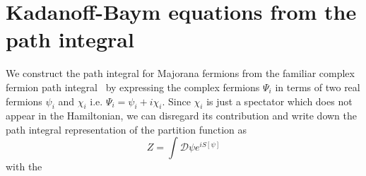 \documentclass[prx,aps,onecolumn,amsfonts,showpacs,superscriptaddress,preprint,eqsecnum]
{revtex4-1}
\begin{document}
\section{Kadanoff-Baym equations from the path integral}
\label{sec:closed}
We construct the path integral for Majorana fermions from the familiar complex fermion path integral~\cite{Sedrakyan2011} by expressing the complex fermions $\Psi_i$ in terms of two real 
fermions $\psi_i$ and $\chi_i$ i.e. $\Psi_i=\psi_i+i\chi_i$. Since 
$\chi_i$ is just a spectator which does not appear in the Hamiltonian, we can disregard its contribution  
and write down the path integral representation of the partition function as
\begin{equation}
Z=\int \mathcal{D}\psi e^{iS[\psi]}
\end{equation}
with the 
\end{document}
